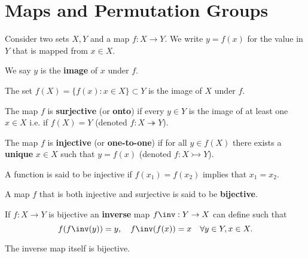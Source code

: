 \documentclass[12pt, a4paper]{article}
\begin{document}
\pagebreak

\section{Maps and Permutation Groups}

Consider two sets \(X,Y\) and a map \(f:X \to Y\). We write \(y=f(x)\) for the value in \(Y\) that is mapped from \(x \in X\).

\begin{definition}
    We say \(y\) is the \textbf{image} of \(x\) under \(f\).
\end{definition}

\begin{definition}
    The set \(f(X) = \{f(x) : x \in X\} \subset Y\) is the image of \(X\) under \(f\).
\end{definition}

\begin{definition}
    The map \(f\) is \textbf{surjective} (or \textbf{onto}) if every \(y \in Y\) is the image of at least one \(x \in X\) i.e. if \(f(X)=Y\) (denoted \(f : X \twoheadrightarrow Y\)).
\end{definition}

\begin{definition}
    The map \(f\) is \textbf{injective} (or \textbf{one-to-one}) if for all \(y\in f(X)\) there exists a \textbf{unique} \(x \in X\) such that \(y=f(x)\) (denoted \(f:X \rightarrowtail Y\)).
\end{definition}

\begin{proposition}
    A function is said to be injective if \(f(x_1)=f(x_2)\) implies that \(x_1=x_2\).
\end{proposition}

\begin{definition}
    A map \(f\) that is both injective and surjective is said to be \textbf{bijective}.
\end{definition}

\begin{theorem}
    If \(f:X\to Y\) is bijective an \textbf{inverse} map \(f\inv:Y\to X\) can define such that 
    \[f(f\inv(y))=y, \quad f\inv(f(x))=x \quad \forall y\in Y, x\in X.\]
\end{theorem}

\begin{mdremark}
The inverse map itself is bijective.
\end{mdremark}
\end{document}
